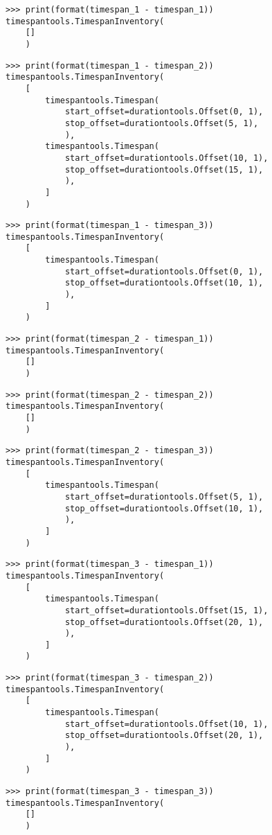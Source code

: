 \begin{singlespacing}
\vspace{-0.5\baselineskip}
\begin{lstlisting}
>>> print(format(timespan_1 - timespan_1))
timespantools.TimespanInventory(
    []
    )
\end{lstlisting}
\begin{lstlisting}
>>> print(format(timespan_1 - timespan_2))
timespantools.TimespanInventory(
    [
        timespantools.Timespan(
            start_offset=durationtools.Offset(0, 1),
            stop_offset=durationtools.Offset(5, 1),
            ),
        timespantools.Timespan(
            start_offset=durationtools.Offset(10, 1),
            stop_offset=durationtools.Offset(15, 1),
            ),
        ]
    )
\end{lstlisting}
\begin{lstlisting}
>>> print(format(timespan_1 - timespan_3))
timespantools.TimespanInventory(
    [
        timespantools.Timespan(
            start_offset=durationtools.Offset(0, 1),
            stop_offset=durationtools.Offset(10, 1),
            ),
        ]
    )
\end{lstlisting}
\begin{lstlisting}
>>> print(format(timespan_2 - timespan_1))
timespantools.TimespanInventory(
    []
    )
\end{lstlisting}
\begin{lstlisting}
>>> print(format(timespan_2 - timespan_2))
timespantools.TimespanInventory(
    []
    )
\end{lstlisting}
\begin{lstlisting}
>>> print(format(timespan_2 - timespan_3))
timespantools.TimespanInventory(
    [
        timespantools.Timespan(
            start_offset=durationtools.Offset(5, 1),
            stop_offset=durationtools.Offset(10, 1),
            ),
        ]
    )
\end{lstlisting}
\begin{lstlisting}
>>> print(format(timespan_3 - timespan_1))
timespantools.TimespanInventory(
    [
        timespantools.Timespan(
            start_offset=durationtools.Offset(15, 1),
            stop_offset=durationtools.Offset(20, 1),
            ),
        ]
    )
\end{lstlisting}
\begin{lstlisting}
>>> print(format(timespan_3 - timespan_2))
timespantools.TimespanInventory(
    [
        timespantools.Timespan(
            start_offset=durationtools.Offset(10, 1),
            stop_offset=durationtools.Offset(20, 1),
            ),
        ]
    )
\end{lstlisting}
\begin{lstlisting}
>>> print(format(timespan_3 - timespan_3))
timespantools.TimespanInventory(
    []
    )
\end{lstlisting}
\end{singlespacing}


